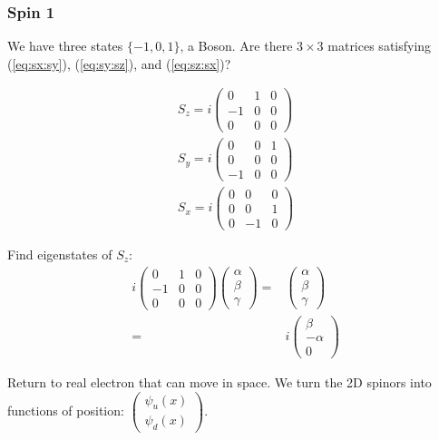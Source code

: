 \documentclass[]{article}
\begin{document}
\subsubsection{Spin 1}

We have three states $\{-1,0,1\}$, a Boson. Are there $3\times3$ matrices satisfying (\ref{eq:sx:sy}), (\ref{eq:sy:sz}), and (\ref{eq:sz:sx})?

\begin{align*}
	S_z = i \begin{pmatrix}
		0&1&0\\
		-1&0&0\\
		0&0&0
	\end{pmatrix}\\
	S_y = i \begin{pmatrix}
		0&0&1\\
		0&0&0\\
		-1&0&0
	\end{pmatrix}\\
	S_x = i \begin{pmatrix}
		0&0&0\\
		0&0&1\\
		0&-1&0
	\end{pmatrix}
\end{align*}

Find eigenstates of $S_z$:
\begin{align*}
	i \begin{pmatrix}
		0&1&0\\
		-1&0&0\\
		0&0&0
	\end{pmatrix}\begin{pmatrix}
		\alpha\\
		\beta\\
		\gamma
	\end{pmatrix}=&\begin{pmatrix}
		\alpha\\
		\beta\\
		\gamma
	\end{pmatrix}\\
	=&i\begin{pmatrix}
		\beta\\
		-\alpha\\
		0
	\end{pmatrix}
\end{align*}

Return to real electron that can move in space. We turn the 2D spinors into functions of position: $\begin{pmatrix}
\psi_u(x)\\
\psi_d(x)
\end{pmatrix}$.
\end{document}
